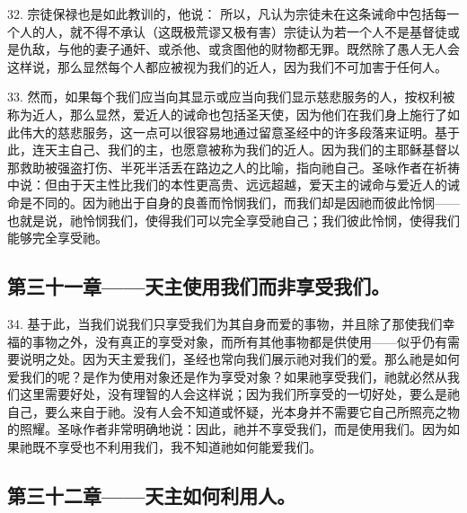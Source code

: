 32. 宗徒保禄也是如此教训的，他说： 所以，凡认为宗徒未在这条诫命中包括每一个人的人，就不得不承认（这既极荒谬又极有害）宗徒认为若一个人不是基督徒或是仇敌，与他的妻子通奸、或杀他、或贪图他的财物都无罪。既然除了愚人无人会这样说，那么显然每个人都应被视为我们的近人，因为我们不可加害于任何人。\par

33. 然而，如果每个我们应当向其显示或应当向我们显示慈悲服务的人，按权利被称为近人，那么显然，爱近人的诫命也包括圣天使，因为他们在我们身上施行了如此伟大的慈悲服务，这一点可以很容易地通过留意圣经中的许多段落来证明。基于此，连天主自己、我们的主，也愿意被称为我们的近人。因为我们的主耶稣基督以那救助被强盗打伤、半死半活丢在路边之人的比喻，指向祂自己。圣咏作者在祈祷中说：但由于天主性比我们的本性更高贵、远远超越，爱天主的诫命与爱近人的诫命是不同的。因为祂出于自身的良善而怜悯我们，而我们却是因祂而彼此怜悯——也就是说，祂怜悯我们，使得我们可以完全享受祂自己；我们彼此怜悯，使得我们能够完全享受祂。\par


\subsection{第三十一章——天主使用我们而非享受我们。}

34. 基于此，当我们说我们只享受我们为其自身而爱的事物，并且除了那使我们幸福的事物之外，没有真正的享受对象，而所有其他事物都是供使用——似乎仍有需要说明之处。因为天主爱我们，圣经也常向我们展示祂对我们的爱。那么祂是如何爱我们的呢？是作为使用对象还是作为享受对象？如果祂享受我们，祂就必然从我们这里需要好处，没有理智的人会这样说；因为我们所享受的一切好处，要么是祂自己，要么来自于祂。没有人会不知道或怀疑，光本身并不需要它自己所照亮之物的照耀。圣咏作者非常明确地说：因此，祂并不享受我们，而是使用我们。因为如果祂既不享受也不利用我们，我不知道祂如何能爱我们。\par


\subsection{第三十二章——天主如何利用人。}


